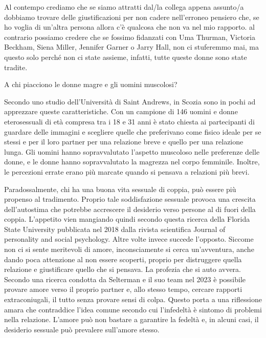 \documentclass[12pt]{book} %
\begin{document}
Al contempo crediamo che se siamo attratti dal/la collega appena assunto/a
dobbiamo trovare delle giustificazioni per non cadere nell'erroneo pensiero che, se ho voglia di
un'altra persona allora c'è qualcosa che non va nel mio rapporto. 
al contrario possiamo
credere che se fossimo fidanzati con Uma Thurman, Victoria Beckham, Siena Miller, Jennifer Garner o Jarry Hall, non ci
stuferemmo mai, ma questo solo perché non ci state assieme, infatti, tutte queste donne sono state tradite.

\begin{mdframed}[linewidth=1pt]
A chi piacciono le donne magre e gli uomini muscolosi?

Secondo uno studio dell'Università di Saint Andrews, in Scozia sono in pochi ad apprezzare queste caratteristiche. Con
un campione di 146 uomini e donne eterosessuali di età compresa tra i 18 e 31 anni è stato chiesta ai partecipanti di
guardare delle immagini e scegliere quelle che preferivano come fisico ideale per se stessi e per il loro partner per
una relazione breve e quello per una relazione lunga. Gli uomini hanno sopravvalutato l'aspetto muscoloso nelle
preferenze delle donne, e le donne hanno sopravvalutato la magrezza nel corpo femminile. Inoltre, le percezioni errate
erano più marcate quando si pensava a relazioni più brevi.
\end{mdframed}

Paradossalmente, chi ha una buona vita sessuale di coppia, può essere più propenso al tradimento. Proprio tale
soddisfazione sessuale provoca una crescita dell'autostima che potrebbe accrescere il desiderio
verso persone al di fuori della coppia. L'appetito vien mangiando quindi secondo questa ricerca
della Florida State University pubblicata nel 2018 dalla rivista scientifica Journal of personality and social
psychology. Altre volte invece succede l'opposto. Siccome non ci si sente meritevoli di amore,
inconsciamente si cerca un'avventura, anche dando poca attenzione al non essere scoperti, proprio
per distruggere quella relazione e giustificare quello che si pensava. La profezia che si auto avvera.
Secondo una ricerca condotta da Selterman e il suo team nel 2023 è possibile provare amore verso il proprio partner e, allo stesso tempo, cercare rapporti extraconiugali, il tutto senza provare sensi di colpa. Questo porta a una riflessione amara che contraddice l'idea comune secondo cui l'infedeltà è sintomo di problemi nella relazione. L'amore può non bastare a garantire la fedeltà e, in alcuni casi, il desiderio sessuale può prevalere sull'amore stesso.
\end{document}
